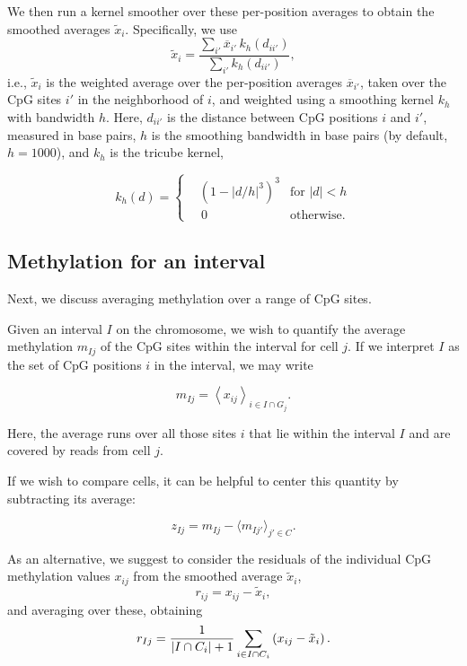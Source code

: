 \documentclass[twocolumn,10pt]{article}
\newcommand{\todo}[1]{[\textcolor{orange}{#1}]}
\begin{document}

We then run a kernel smoother over these per-position averages to obtain the smoothed averages $\tilde x_i$. Specifically, we use
\[ \tilde x_i = \frac{\sum_{i'} \overline x_{i'}\, k_h(d_{ii'})}{\sum_{i'} k_h(d_{ii'})},\]
i.e., $\tilde x_i$ is the weighted average over the per-position averages $\overline{x}_{i'}$, taken over the CpG sites $i'$ in the neighborhood of $i$, and weighted using a smoothing kernel $k_h$ with bandwidth $h$. Here, $d_{ii'}$ is the distance between CpG positions $i$ and $i'$, measured in base pairs, $h$ is the smoothing bandwidth in base pairs (by default, $h=1000$), and $k_h$ is the tricube kernel,

\[ k_h(d) = \left\{
\begin{aligned}
    &\left(1-|d/h|^3\right)^3 &\text{for } |d|<h \\
    &\,0 &\text{otherwise}. 
\end{aligned}
\right.
\]

\subsection{Methylation for an interval}

Next, we discuss averaging methylation over a range of CpG sites.

Given an interval $I$ on the chromosome, we wish to quantify the average methylation $m_{Ij}$ of the CpG sites within the interval for cell $j$. If we interpret $I$ as the set of CpG positions $i$ in the interval, we may write

$$ m_{Ij} = \left< x_{ij} \right>_{i\in I\cap G_j}.$$

Here, the average runs over all those sites $i$ that lie within the interval $I$ and are covered by reads from cell $j$.

If we wish to compare cells, it can be helpful to center this quantity by subtracting its average:

$$ z_{Ij} = m_{Ij} - \langle m_{Ij'}\rangle_{j'\in C}.$$

As an alternative, we suggest to consider the residuals of the individual CpG methylation values $x_{ij}$ from the smoothed average $\tilde x_i$,
$$ r_{ij} = x_{ij} - \tilde x_i, $$
and averaging over these, obtaining
\begin{equation} 
r_{Ij} = \frac{\scriptsize{1}}{\scriptsize{|I\cap C_i|+1}}\sum_{i\in I\cap C_i}\left( x_{ij} - \tilde x_i \right). \label{avgres}
\end{equation}
\end{document}
